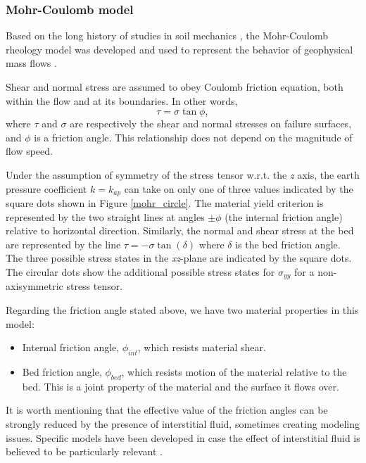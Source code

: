 \documentclass{article}
\begin{document}
\subsubsection{Mohr-Coulomb model}\label{MCM}
Based on the long history of studies in soil mechanics \cite{Rankine1857}, the Mohr-Coulomb rheology model was developed and used to represent the behavior of geophysical mass flows \cite{SavageHutter1989}.

Shear and normal stress are assumed to obey Coulomb friction equation, both within the flow and at its boundaries. In other words,
\begin{equation}
\tau = \sigma \tan \phi,
\end{equation}
where $\tau$ and $\sigma$ are respectively the shear and normal stresses on failure surfaces, and $\phi$ is a friction angle. This relationship does not depend on the magnitude of flow speed.

Under the assumption of symmetry of the stress tensor w.r.t. the \textit{z} axis, the earth pressure coefficient $k=k_{ap}$ can take on only one of three values indicated by the square dots shown in Figure \ref{mohr_circle}. The material yield criterion is represented by the two straight lines at angles $\pm \phi$ (the internal friction angle) relative to horizontal direction. Similarly, the normal and shear stress at the bed are represented by the line $\tau=-\sigma \tan(\delta)$ where $\delta$ is the bed friction angle. The three possible stress states in the \textit{xz}-plane are indicated by the square dots. The circular dots show the additional possible stress states for $\sigma_{yy}$ for a non-axisymmetric stress tensor.

Regarding the friction angle stated above, we have two material properties in this model:
\begin{itemize}
\item Internal friction angle, $\phi_{int}$, which resists material shear.
\item Bed friction angle, $\phi_{bed}$, which resists motion of the material relative to the bed. This is a joint property of the material and the surface it flows over.
\end{itemize}
It is worth mentioning that the effective value of the friction angles can be strongly reduced by the presence of interstitial fluid, sometimes creating modeling issues. Specific models have been developed in case the effect of interstitial fluid is believed to be particularly relevant \citep{PitmanLe2005}.
\end{document}
